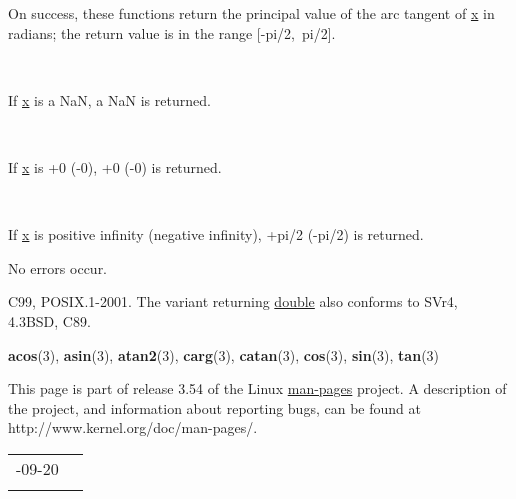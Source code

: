\documentclass[]{article}
\let\realtextbf=\textbf
\renewcommand{\textbf}[1]{\textcolor{boldcolor}{\realtextbf{#1}}}
\renewcommand{\emph}[1]{\underline{#1}}
\begin{document}

On success, these functions return the principal value of the arc
tangent of \emph{x} in radians; the return value is in the range
{[}-pi/2,~pi/2{]}.

~

If \emph{x} is a NaN, a NaN is returned.

~

If \emph{x} is +0 (-0), +0 (-0) is returned.

~

If \emph{x} is positive infinity (negative infinity), +pi/2 (-pi/2) is
returned.


No errors occur.


C99, POSIX.1-2001. The variant returning \emph{double} also conforms to
SVr4, 4.3BSD, C89.


\textbf{acos}(3), \textbf{asin}(3), \textbf{atan2}(3), \textbf{carg}(3),
\textbf{catan}(3), \textbf{cos}(3), \textbf{sin}(3), \textbf{tan}(3)


This page is part of release 3.54 of the Linux \emph{man-pages} project.
A description of the project, and information about reporting bugs, can
be found at http://www.kernel.org/doc/man-pages/.

\begin{longtable}[c]{@{}ll@{}}
\toprule\addlinespace
2010-09-20 &
\\\addlinespace
\bottomrule
\end{longtable}
\end{document}
